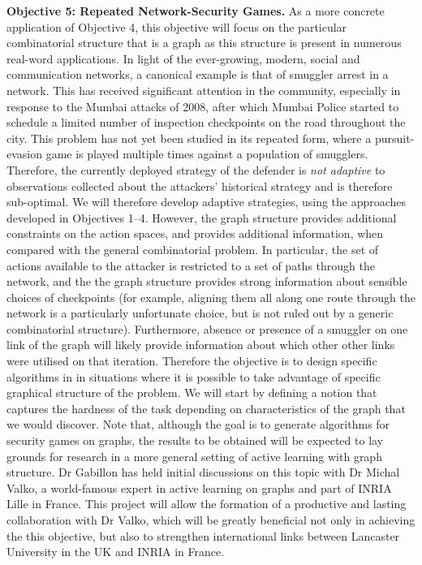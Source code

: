 \textbf{Objective 5:  Repeated Network-Security Games.}
As a more concrete application of Objective 4, this objective will focus on the particular combinatorial structure that is a graph as this structure is present in  numerous real-word applications.
In light of the ever-growing, modern, social and communication networks, a canonical example is that of smuggler arrest in a network\cite{jain2011double}. This has received significant attention in the community, especially in  response  to  the  Mumbai  attacks  of  2008, after which  Mumbai  Police
started to schedule a limited number of inspection checkpoints
on the road throughout the city.
This problem has not yet been studied in its repeated form, where a pursuit-evasion game is played multiple times against a population of smugglers. Therefore, the currently deployed strategy of the defender is \textit{not adaptive} to observations collected about the attackers' historical strategy and is therefore sub-optimal.  We will therefore develop adaptive strategies, using the approaches developed in Objectives 1--4.  However, the graph structure provides additional constraints on the action spaces, and provides additional information, when compared with the general combinatorial problem.  In particular, the set of actions available to the attacker is restricted to a set of paths through the network, and the the graph structure provides strong information about sensible choices of checkpoints (for example, aligning them all along one route through the network is a particularly unfortunate choice, but is not ruled out by a generic combinatorial structure).  Furthermore, absence or presence of a smuggler on one link of the graph will likely provide information about which other other links were utilised on that iteration. Therefore the objective  is to design specific algorithms in in situations where it is possible to take advantage of specific graphical structure of the problem. We will start by defining a notion that captures the hardness of the task depending on characteristics of the graph that we would discover. Note that, although the goal is to generate algorithms for security games on graphs, the results to be obtained will be expected to lay grounds for research in a more general setting of active learning with graph structure. Dr Gabillon has held initial discussions on this topic with Dr Michal Valko, a world-famous expert in active learning on graphs and part of INRIA Lille in France. This project will allow the formation of a productive and lasting collaboration with Dr Valko, which will be greatly beneficial not only in achieving the this objective, but also to strengthen international links between Lancaster University in the UK and INRIA in France.  
 
